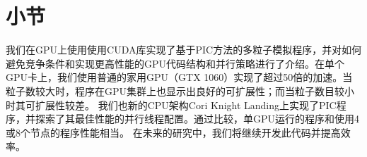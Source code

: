 \section{小节}

我们在GPU上使用使用CUDA库实现了基于PIC方法的多粒子模拟程序，并对如何避免竞争条件和实现更高性能的GPU代码结构和并行策略进行了介绍。在单个GPU卡上，我们使用普通的家用GPU（GTX 1060）实现了超过50倍的加速。当粒子数较大时，程序在GPU集群上也显示出良好的可扩展性；而当粒子数目较小时其可扩展性较差。
我们也新的CPU架构Cori Knight Landing上实现了PIC程序，并探索了其最佳性能的并行线程配置。通过比较，单GPU运行的程序和使用4或8个节点的程序性能相当。
在未来的研究中，我们将继续开发此代码并提高效率。

%
